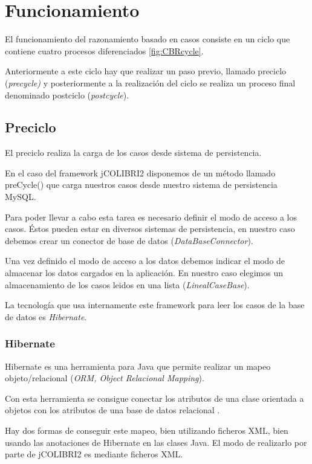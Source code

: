\section{Funcionamiento}\label{funcionamiento}

El funcionamiento del razonamiento basado en casos consiste en un ciclo que contiene cuatro procesos diferenciados \ref{fig:CBRcycle}.

Anteriormente a este ciclo hay que realizar un paso previo, llamado preciclo (\emph{precycle)} y posteriormente a la realización del ciclo se realiza un proceso final denominado postciclo (\emph{postcycle}).

\subsection{Preciclo}\label{preciclo}

El preciclo realiza la carga de los casos desde sistema de persistencia.

En el caso del framework jCOLIBRI2 \cite{colibri:tut} disponemos de un método llamado preCycle() que carga nuestros casos desde nuestro sistema de persistencia MySQL.

Para poder llevar a cabo esta tarea es necesario definir el modo de acceso a los casos. Éstos pueden estar en diversos sistemas de persistencia, en nuestro caso debemos crear un conector de base de datos (\emph{DataBaseConnector}).

Una vez definido el modo de acceso a los datos debemos indicar el modo de almacenar los datos cargados en la aplicación. En nuestro caso elegimos un almacenamiento de los casos leidos en una lista (\emph{LinealCaseBase}).

La tecnología que usa internamente este framework para leer los casos de la base de datos es \emph{Hibernate}.

\subsubsection{Hibernate}\label{hibernate}

Hibernate es una herramienta para Java que permite realizar un mapeo objeto/relacional (\emph{ORM, Object Relacional Mapping}).

Con esta herramienta se consigue conectar los atributos de una clase orientada a objetos con los atributos de una base de datos relacional \cite{hibe:info}.

Hay dos formas de conseguir este mapeo, bien utilizando ficheros XML, bien usando las anotaciones de Hibernate en las clases Java. El modo de realizarlo por parte de jCOLIBRI2 es mediante ficheros XML.

